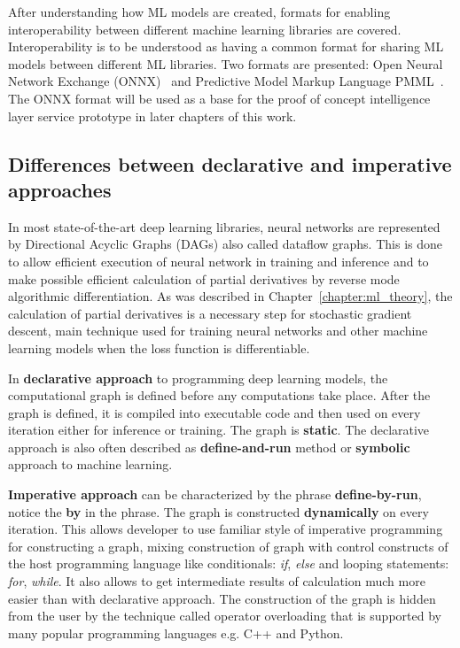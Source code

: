 \documentclass[english, 12pt, a4paper, elec, utf8, online]{aaltothesis}
\begin{document}
After understanding how ML models are created, formats for enabling interoperability between different machine learning libraries are covered. Interoperability is to be understood as having a common format for sharing ML models between different ML libraries. Two formats are presented: Open Neural Network Exchange (ONNX)~\cite{hazelwood2018applied} and Predictive Model Markup Language PMML~\cite{guazzelli2009pmml}. The ONNX format will be used as a base for the proof of concept intelligence layer service prototype in later chapters of this work.

\subsection{Differences between declarative and imperative approaches}\label{subsec:dec_vs_imp}
In most state-of-the-art deep learning libraries, neural networks are represented by Directional Acyclic Graphs (DAGs) also called dataflow graphs. This is done to allow efficient execution of neural network in training and inference and to make possible efficient calculation of partial derivatives by reverse mode algorithmic differentiation. As was described in Chapter~\ref{chapter:ml_theory}, the calculation of partial derivatives is a necessary step for stochastic gradient descent, main technique used for training neural networks and other machine learning models when the loss function is differentiable.

In \textbf{declarative approach} to programming deep learning models, the computational graph is defined before any computations take place. After the graph is defined, it is compiled into executable code and then used on every iteration either for inference or training. The graph is \textbf{static}. The declarative approach is also often described as \textbf{define-and-run} method or \textbf{symbolic} approach to machine learning.

\textbf{Imperative approach} can be characterized by the phrase \textbf{define-by-run}, notice the \textbf{by} in the phrase. The graph is constructed \textbf{dynamically} on every iteration. This allows developer to use familiar style of imperative programming for constructing a graph, mixing construction of graph with control constructs of the host programming language like conditionals: \textit{if}, \textit{else} and looping statements: \textit{for}, \textit{while}. It also allows to get intermediate results of calculation much more easier than with declarative approach. The construction of the graph is hidden from the user by the technique called operator overloading that is supported by many popular programming languages e.g. C++ and Python.
\end{document}
